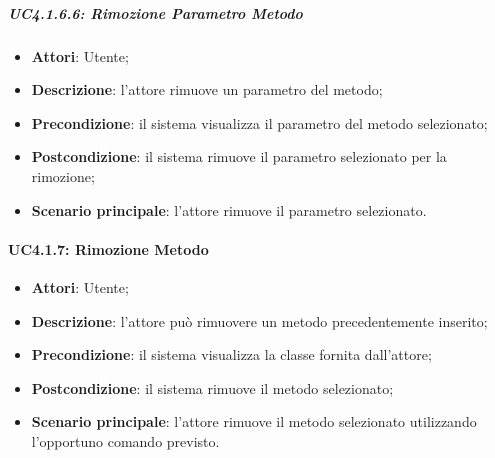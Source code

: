 \subparagraph{UC4.1.6.6: Rimozione Parametro Metodo}
\label{UC4.1.6.6}
\begin{itemize}
\item \textbf{Attori}: Utente;
\item \textbf{Descrizione}: l'attore rimuove un parametro del metodo;
\item \textbf{Precondizione}: il sistema visualizza il parametro del metodo selezionato;	
\item \textbf{Postcondizione}: il sistema rimuove il parametro selezionato per la rimozione;
\item \textbf{Scenario principale}:
l'attore rimuove il parametro selezionato.
\end{itemize}

\paragraph{UC4.1.7: Rimozione Metodo}
\label{UC4.1.7}
\begin{itemize}
\item \textbf{Attori}: Utente;
\item \textbf{Descrizione}: l'attore può rimuovere un metodo precedentemente inserito;
\item \textbf{Precondizione}: il sistema visualizza la classe fornita dall'attore;
\item \textbf{Postcondizione}: il sistema rimuove il metodo selezionato;
\item \textbf{Scenario principale}:
l'attore rimuove il metodo selezionato utilizzando l'opportuno comando previsto.
\end{itemize}

